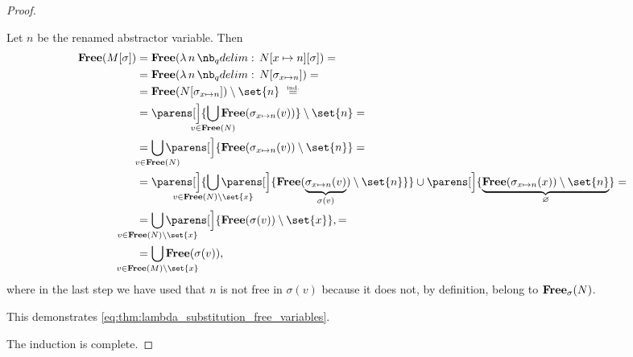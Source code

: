 \begin{proof}
\begin{itemize}
\begin{itemize}
      Let \( n \) be the renamed abstractor variable. Then
      \begin{align*}
        \op*{Free}(M[\sigma])
        &=
        \op*{Free}(\qabs n N[x \mapsto n][\sigma])
        = \\ &=
        \op*{Free}(\qabs n N[\sigma_{x \mapsto n}])
        = \\ &=
        \op*{Free}(N[\sigma_{x \mapsto n}]) \setminus \set{ n }
        \reloset {\T{ind.}} = \\ &=
        \parens[\Big]{ \bigcup_{\mathclap{v \in \op*{Free}(N)}} \op*{Free}(\sigma_{x \mapsto n}(v)) } \setminus \set{ n }
        = \\ &=
        \bigcup_{\mathclap{v \in \op*{Free}(N)}} \parens[\Big]{ \op*{Free}(\sigma_{x \mapsto n}(v)) \setminus \set{ n } }
        = \\ &=
        \parens[\Big]{ \bigcup_{\mathclap{v \in \op*{Free}(N) \setminus \set{ x }}} \parens[\Big]{ \op*{Free}(\underbrace{\sigma_{x \mapsto n}(v)}_{\sigma(v)}) \setminus \set{ n } } } \cup \parens[\Big]{ \underbrace{\op*{Free}(\sigma_{x \mapsto n}(x)) \setminus \set{ n }}_\varnothing }
        = \\ &=
        \bigcup_{\mathclap{v \in \op*{Free}(N) \setminus \set{ x }}} \parens[\Big]{ \op*{Free}(\sigma(v)) \setminus \set{ x } },
        = \\ &=
        \bigcup_{\mathclap{v \in \op*{Free}(M) \setminus \set{ x }}} \op*{Free}(\sigma(v)),
      \end{align*}
      where in the last step we have used that \( n \) is not free in \( \sigma(v) \) because it does not, by definition, belong to \( \op*{Free}_\sigma(N) \).

      This demonstrates \eqref{eq:thm:lambda_substitution_free_variables}.
    \end{itemize}
  \end{itemize}

  The induction is complete.
\end{proof}

